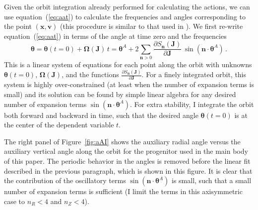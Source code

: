 \documentclass[12pt,preprint]{aastex}
\newcommand{\eqnname}{equation}
\newcommand{\equationname}{\eqnname}
\renewcommand{\figurename}{Figure}
\renewcommand{\vec}[1]{\ensuremath{\mathbf{#1}}}
\newcommand{\vecx}{\ensuremath{\vec{x}}}
\newcommand{\vecv}{\ensuremath{\vec{v}}}
\newcommand{\vecj}{\ensuremath{\vec{J}}}
\newcommand{\vecn}{\ensuremath{\vec{n}}}
\newcommand{\veco}{\ensuremath{\vec{\Omega}}}
\newcommand{\veca}{\ensuremath{\boldsymbol\theta}}
\begin{document}
Given the orbit integration already performed for calculating the
actions, we can use \equationname~(\ref{eq:aat}) to calculate the
frequencies and angles corresponding to the point $(\vecx,\vecv)$
(this procedure is similar to that used in \citealt{McMillan08a}). We
first re-write \equationname~(\ref{eq:aat}) in terms of the angle at
time zero and the frequencies
\begin{equation}\label{eq:aat2}
  \veca = \veca(t=0) + \veco(\vecj) \,t = \veca^A +2\sum_{\vecn > 0} \frac{\partial S_{\vecn}(\vecj)}{\partial \vecj}\,\sin(\vecn\cdot\veca^A)\,.
\end{equation}
This is a linear system of equations for each point along the orbit
with unknowns $\veca(t=0)$, $\veco(\vecj)$, and the functions
$\frac{\partial S_{\vecn}(\vecj)}{\partial \vecj}$. For a finely
integrated orbit, this system is highly over-constrained (at least
when the number of expansion terms is small) and its solution can be
found by simple linear algebra for any desired number of expansion
terms $\sin(\vecn\cdot\veca^A)$. For extra stability, I integrate the
orbit both forward and backward in time, such that the desired angle
$\veca(t=0)$ is at the center of the dependent variable $t$.

The right panel of \figurename~\ref{fig:aAI} shows the auxiliary
radial angle versus the auxiliary vertical angle along the orbit for
the progenitor used in the main body of this paper. The periodic
behavior in the angles is removed before the linear fit described in
the previous paragraph, which is shown in this figure. It is clear
that the contribution of the oscillatory terms
$\sin(\vecn\cdot\veca^A)$ is small, such that a small number of
expansion terms is sufficient (I limit the terms in this axisymmetric
case to $n_R < 4$ and $n_Z < 4$).
\end{document}
